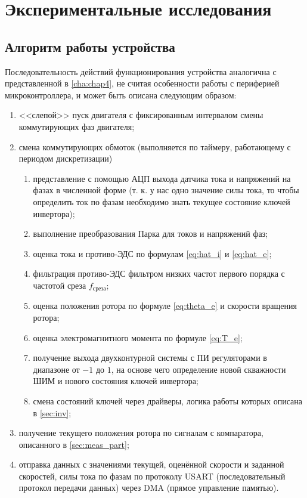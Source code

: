 \chapter{Экспериментальные исследования}
\label{cha:chap6}

\section{Алгоритм работы устройства}

Последовательность действий функционирования устройства аналогична с представленной в \ref{cha:chap4}, не считая особенности работы с периферией микроконтроллера, и может быть описана следующим образом:
\begin{enumerate}
	\item <<слепой>> пуск двигателя с фиксированным интервалом смены коммутирующих фаз двигателя;
	\item смена коммутирующих обмоток (выполняется по таймеру, работающему с периодом дискретизации)
	\begin{enumerate}
		\item представление с помощью АЦП выхода датчика тока и напряжений на фазах в численной форме (т. к. у нас одно значение силы тока, то чтобы определить ток по фазам необходимо знать текущее состояние ключей инвертора);
		\item выполнение преобразования Парка для токов и напряжений фаз;
		\item оценка тока и противо-ЭДС по формулам \ref{eq:hat_i} и \ref{eq:hat_e};
		\item фильтрация противо-ЭДС фильтром низких частот первого порядка с частотой среза $f_{\textrm{среза}}$;
		\item оценка положения ротора по формуле \ref{eq:theta_e} и скорости вращения ротора;
		\item оценка электромагнитного момента по формуле \ref{eq:T_e};
		\item получение выхода двухконтурной системы с ПИ регуляторами в диапазоне от $-1$ до $1$, на основе чего определение новой скважности ШИМ и нового состояния ключей инвертора;
		\item смена состояний ключей через драйверы, логика работы которых описана в \ref{sec:inv};
	\end{enumerate}
	\item получение текущего положения ротора по сигналам с компаратора, описанного в \ref{sec:meas_part};
	\item отправка данных с значениями текущей, оценённой скорости и заданной скоростей, силы тока по фазам по протоколу USART (последовательный протокол передачи данных) через DMA (прямое управление памятью).
\end{enumerate}

